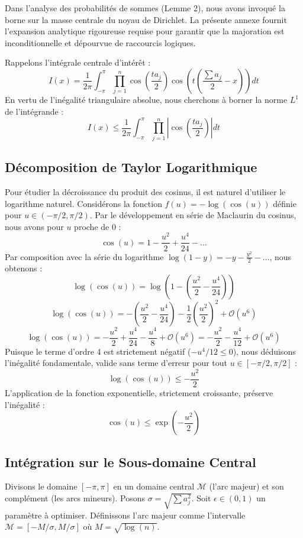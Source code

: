 \documentclass[12pt,a4paper]{article}
\begin{document}
Dans l'analyse des probabilités de sommes (Lemme 2), nous avons invoqué la borne sur la masse centrale du noyau de Dirichlet. La présente annexe fournit l'expansion analytique rigoureuse requise pour garantir que la majoration est inconditionnelle et dépourvue de raccourcis logiques.

Rappelons l'intégrale centrale d'intérêt :
$$ I(x) = \frac{1}{2\pi} \int_{-\pi}^{\pi} \prod_{j=1}^n \cos\left( \frac{t a_j}{2} \right) \cos\left( t \left( \frac{\sum a_j}{2} - x \right) \right) dt $$
En vertu de l'inégalité triangulaire absolue, nous cherchons à borner la norme $L^1$ de l'intégrande :
$$ I(x) \le \frac{1}{2\pi} \int_{-\pi}^{\pi} \prod_{j=1}^n \left| \cos\left( \frac{t a_j}{2} \right) \right| dt $$

\subsection{Décomposition de Taylor Logarithmique}
Pour étudier la décroissance du produit des cosinus, il est naturel d'utiliser le logarithme naturel.
Considérons la fonction $f(u) = -\log(\cos(u))$ définie pour $u \in (-\pi/2, \pi/2)$.
Par le développement en série de Maclaurin du cosinus, nous avons pour $u$ proche de $0$ :
$$ \cos(u) = 1 - \frac{u^2}{2} + \frac{u^4}{24} - \dots $$
Par composition avec la série du logarithme $\log(1-y) = -y - \frac{y^2}{2} - \dots$, nous obtenons :
$$ \log(\cos(u)) = \log\left(1 - \left(\frac{u^2}{2} - \frac{u^4}{24}\right)\right) $$
$$ \log(\cos(u)) = -\left(\frac{u^2}{2} - \frac{u^4}{24}\right) - \frac{1}{2}\left(\frac{u^2}{2}\right)^2 + \mathcal{O}(u^6) $$
$$ \log(\cos(u)) = -\frac{u^2}{2} + \frac{u^4}{24} - \frac{u^4}{8} + \mathcal{O}(u^6) = -\frac{u^2}{2} - \frac{u^4}{12} + \mathcal{O}(u^6) $$
Puisque le terme d'ordre 4 est strictement négatif ($-u^4/12 \le 0$), nous déduisons l'inégalité fondamentale, valide sans terme d'erreur pour tout $u \in [-\pi/2, \pi/2]$ :
$$ \log(\cos(u)) \le -\frac{u^2}{2} $$
L'application de la fonction exponentielle, strictement croissante, préserve l'inégalité :
$$ \cos(u) \le \exp\left( -\frac{u^2}{2} \right) $$

\subsection{Intégration sur le Sous-domaine Central}
Divisons le domaine $[-\pi, \pi]$ en un domaine central $\mathcal{M}$ (l'arc majeur) et son complément (les arcs mineurs).
Posons $\sigma = \sqrt{\sum a_j^2}$. Soit $\epsilon \in (0, 1)$ un paramètre à optimiser. Définissons l'arc majeur comme l'intervalle $\mathcal{M} = [-M/\sigma, M/\sigma]$ où $M = \sqrt{\log(n)}$.
\end{document}
